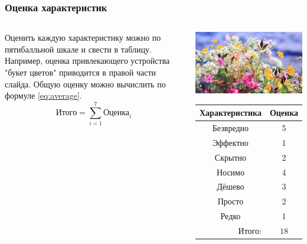 \begin{frame}
    \frametitle{Оценка характеристик}

    \begin{columns}
            Оценить каждую характеристику можно по пятибалльной шкале и свести в таблицу. Например, оценка привлекающего устройства \alert{"букет цветов"} приводится в правой части слайда. Общую оценку можно вычислить по формуле \eqref{eq:average}.
            \begin{equation}
                \label{eq:average}
                \text{Итого}={\displaystyle\sum_{i=1}^{7}\text{Оценка}_i}
            \end{equation}
            
            
            \begin{center}
                \includegraphics[width=.4\textheight]{fig/flowers}
                
                \begin{tabular}{c|c}
                    \hline\hline
                    Характеристика              & Оценка\\ \hline\hline
                    Безвредно                   & 5 \\
                    Эффектно                    & 1 \\
                    Скрытно                     & 2 \\
                    Носимо                      & 4 \\
                    Дёшево                      & 3 \\
                    Просто                      & 2 \\ 
                    Редко                       & 1 \\ \hline
                    \multicolumn{1}{r|}{Итого:} & $18$ \\
                \end{tabular}
            \end{center}
    \end{columns}    
\end{frame}

